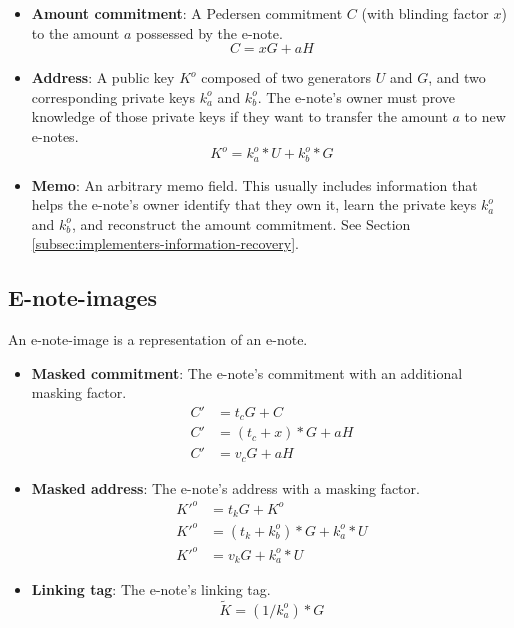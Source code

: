 \begin{itemize}
    \item \textbf{Amount commitment}: A Pedersen commitment $C$ (with blinding factor $x$) to the amount $a$ possessed by the e-note.
    \[C = x G + a H\]

    \item \textbf{Address}: A public key $K^o$ composed of two generators $U$ and $G$, and two corresponding private keys $k^o_a$ and $k^o_b$. The e-note's owner must prove knowledge of those private keys if they want to transfer the amount $a$ to new e-notes.\vspace{.115cm}
    \[K^o = k^o_a*U + k^o_b*G\]

    \item \textbf{Memo}: An arbitrary memo field. This usually includes information that helps the e-note's owner identify that they own it, learn the private keys $k^o_a$ and $k^o_b$, and reconstruct the amount commitment. See Section \ref{subsec:implementers-information-recovery}.
\end{itemize}


\subsection{E-note-images}
\label{subsec:seraphis-e-note-images}

An e-note-image is a representation of an e-note.

\begin{itemize}
    \item \textbf{Masked commitment}: The e-note's commitment with an additional masking factor.\vspace{.115cm}
    \begin{align*}
        C' &= t_c G + C \\
        C' &= (t_c + x)*G + a H \\
        C' &= v_c G + a H
    \end{align*}

    \item \textbf{Masked address}: The e-note's address with a masking factor.\vspace{.115cm}
    \begin{align*}
        K'^o &= t_k G + K^o \\
        K'^o &= (t_k + k^o_b)*G + k^o_a*U \\
        K'^o &= v_k G + k^o_a*U
    \end{align*}

    \item \textbf{Linking tag}: The e-note's linking tag.\vspace{.115cm}
    \[\tilde{K} = (1/k^o_a)*G\]
\end{itemize}

